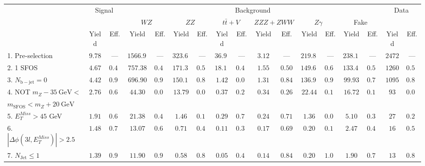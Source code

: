 \begin{tabular}{l||c|c||c|c||c|c||c|c||c|c||c|c||c|c||c|c}
\hline
 &                 \multicolumn{2}{c||}{Signal}            &  \multicolumn{12}{c||}{Background} &  \multicolumn{2}{c}{Data} \\
 & &  & \multicolumn{2}{c||}{$WZ$} & \multicolumn{2}{c||}{$ZZ$} & \multicolumn{2}{c||}{$t\bar{t}+V$} & \multicolumn{2}{c||}{$ZZZ+ZWW$} & \multicolumn{2}{c||}{$Z\gamma$} & \multicolumn{2}{c||}{Fake} &  & \\ 
 & Yield & Eff. & Yield & Eff. & Yield & Eff. & Yield & Eff. & Yield & Eff. & Yield & Eff. & Yield & Eff. & Yield & Eff.\\
\hline\hline
1. Pre-selection &  $9.78$ & --- &  $1566.91$ & --- &  $323.60$ & --- &  $36.93$ & --- &  $3.12$ & --- &  $219.80$ & --- &  $238.12$ & ---  & $2472$ &  --- \\
\hline
2. 1 SFOS &  $4.67$ &  $0.48$ &  $757.38$ &  $0.48$ &  $171.39$ &  $0.53$ &  $18.10$ &  $0.49$ &  $1.55$ &  $0.50$ &  $149.60$ &  $0.68$ &  $133.47$ &  $0.56$ & $1260$ &  $0.51$\\ 
\hline
3. $N_{\mathrm{b-jet}} = 0$ &  $4.42$ &  $0.94$ &  $696.90$ &  $0.92$ &  $150.14$ &  $0.88$ &  $1.42$ &  $0.08$ &  $1.31$ &  $0.84$ &  $136.96$ &  $0.92$ &  $99.93$ &  $0.75$ & $1095$ &  $0.87$\\ 
\hline
4. NOT $m_Z - 35~\mathrm{GeV} <$  &  \multirow{2}{*}{$2.76$} &  \multirow{2}{*}{$0.63$} &  \multirow{2}{*}{$44.30$} &  \multirow{2}{*}{$0.06$} &  \multirow{2}{*}{$13.79$} &  \multirow{2}{*}{$0.09$} &  \multirow{2}{*}{$0.37$} &  \multirow{2}{*}{$0.26$} &  \multirow{2}{*}{$0.34$} &  \multirow{2}{*}{$0.26$} &  \multirow{2}{*}{$22.44$} &  \multirow{2}{*}{$0.16$} &  \multirow{2}{*}{$16.72$} &  \multirow{2}{*}{$0.17$} & \multirow{2}{*}{$93$} &  \multirow{2}{*}{$0.08$}\\ 
$ m_{\mathrm{SFOS}} < m_Z + 20~\mathrm{GeV}$  & & & & & & & & & & & & & &  & \\
\hline
5. $E_{T}^{Miss} > 45$ GeV &  $1.91$ &  $0.69$ &  $21.38$ &  $0.48$ &  $1.46$ &  $0.11$ &  $0.29$ &  $0.78$ &  $0.24$ &  $0.71$ &  $1.36$ &  $0.06$ &  $5.10$ &  $0.31$ & $27$ &  $0.29$\\ 
\hline
6. $|\Delta\phi(3l,E_{T}^{Miss})| > 2.5$ &  $1.48$ &  $0.77$ &  $13.07$ &  $0.61$ &  $0.71$ &  $0.49$ &  $0.11$ &  $0.39$ &  $0.17$ &  $0.69$ &  $0.20$ &  $0.15$ &  $2.47$ &  $0.48$ & $16$ &  $0.59$\\ 
\hline
7. $N_{\mathrm{Jet}} \leq 1$ &  $1.39$ &  $0.94$ &  $11.90$ &  $0.91$ &  $0.58$ &  $0.82$ &  $0.05$ &  $0.45$ &  $0.14$ &  $0.84$ &  $0.20$ &  $1.00$ &  $1.90$ &  $0.77$ & $13$ &  $0.81$\\ 
\hline
\end{tabular}
